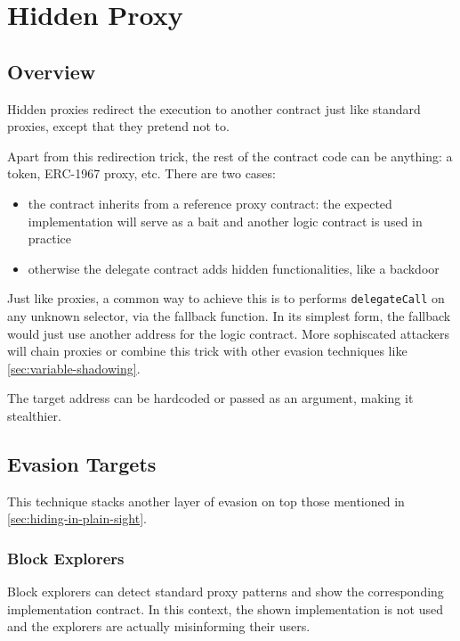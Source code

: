 \section{Hidden Proxy} \label{sec:hidden-proxy}

\subsection{Overview}

Hidden proxies redirect the execution to another contract just like standard proxies, except that they pretend not to.

Apart from this redirection trick, the rest of the contract code can be anything: a token, ERC-1967 proxy, etc.
There are two cases:

\begin{itemize}
\item{the contract inherits from a reference proxy contract: the expected implementation will serve as a bait and another logic contract is used in practice}
\item{otherwise the delegate contract adds hidden functionalities, like a backdoor}
\end{itemize}

Just like proxies, a common way to achieve this is to performs \lstinline{delegateCall} on any unknown selector, via the fallback function.
In its simplest form, the fallback would just use another address for the logic contract.
More sophiscated attackers will chain proxies or combine this trick with other evasion techniques like \ref{sec:variable-shadowing}.

The target address can be hardcoded or passed as an argument, making it stealthier.

\subsection{Evasion Targets}

This technique stacks another layer of evasion on top those mentioned in \ref{sec:hiding-in-plain-sight}.

\subsubsection{Block Explorers}

Block explorers can detect standard proxy patterns and show the corresponding implementation contract.
In this context, the shown implementation is not used and the explorers are actually misinforming their users.

